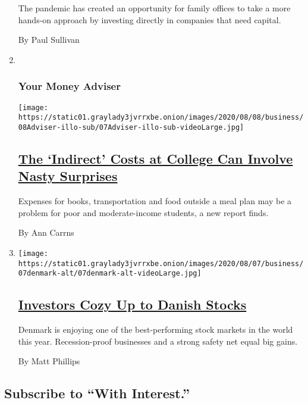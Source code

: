 \begin{enumerate}
  The pandemic has created an opportunity for family offices to take a
  more hands-on approach by investing directly in companies that need
  capital.

  By Paul Sullivan
\item ~
  \hypertarget{your-money-adviser}{%
  \subsubsection{Your Money Adviser}\label{your-money-adviser}}

  \texttt{[image: https://static01.graylady3jvrrxbe.onion/images/2020/08/08/business/08Adviser-illo-sub/07Adviser-illo-sub-videoLarge.jpg]}

  \hypertarget{the-indirect-costs-at-college-can-involve-nasty-surprises}{%
  \subsection{\texorpdfstring{\href{/2020/08/07/your-money/college-costs-tuition.html}{The
  `Indirect' Costs at College Can Involve Nasty
  Surprises}}{The `Indirect' Costs at College Can Involve Nasty Surprises}}\label{the-indirect-costs-at-college-can-involve-nasty-surprises}}

  Expenses for books, transportation and food outside a meal plan may be
  a problem for poor and moderate-income students, a new report finds.

  By Ann Carrns
\item
  \texttt{[image: https://static01.graylady3jvrrxbe.onion/images/2020/08/07/business/07denmark-alt/07denmark-alt-videoLarge.jpg]}

  \hypertarget{investors-cozy-up-to-danish-stocks}{%
  \subsection{\texorpdfstring{\href{/2020/08/07/business/stock-market-denmark.html}{Investors
  Cozy Up to Danish
  Stocks}}{Investors Cozy Up to Danish Stocks}}\label{investors-cozy-up-to-danish-stocks}}

  Denmark is enjoying one of the best-performing stock markets in the
  world this year. Recession-proof businesses and a strong safety net
  equal big gains.

  By Matt Phillips
\end{enumerate}

\hypertarget{subscribe-to-with-interest}{%
\subsection{Subscribe to ``With
Interest.''}\label{subscribe-to-with-interest}}

